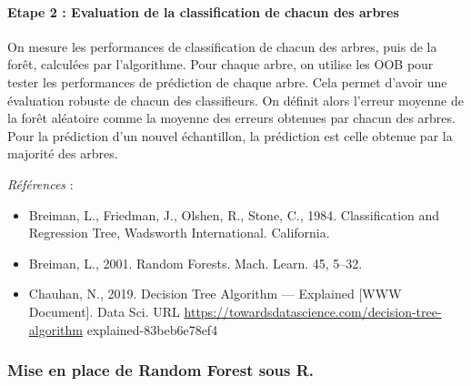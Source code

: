 \documentclass[
]{article}
\begin{document}
\hypertarget{etape-2-evaluation-de-la-classification-de-chacun-des-arbres}{%
\paragraph{Etape 2 : Evaluation de la classification de chacun des
arbres}\label{etape-2-evaluation-de-la-classification-de-chacun-des-arbres}}

On mesure les performances de classification de chacun des arbres, puis
de la forêt, calculées par l'algorithme. Pour chaque arbre, on utilise
les OOB pour tester les performances de prédiction de chaque arbre. Cela
permet d'avoir une évaluation robuste de chacun des classifieurs. On
définit alors l'erreur moyenne de la forêt aléatoire comme la moyenne
des erreurs obtenues par chacun des arbres. Pour la prédiction d'un
nouvel échantillon, la prédiction est celle obtenue par la majorité des
arbres.

\emph{Références} :

\begin{itemize}
\item
  Breiman, L., Friedman, J., Olshen, R., Stone, C., 1984. Classification
  and Regression Tree, Wadsworth International. California.
\item
  Breiman, L., 2001. Random Forests. Mach. Learn. 45, 5--32.
\item
  Chauhan, N., 2019. Decision Tree Algorithm --- Explained {[}WWW
  Document{]}. Data Sci. URL
  \url{https://towardsdatascience.com/decision-tree-algorithm}
  explained-83beb6e78ef4
\end{itemize}

\hypertarget{mise-en-place-de-random-forest-sous-r.}{%
\subsubsection{Mise en place de Random Forest sous
R.}\label{mise-en-place-de-random-forest-sous-r.}}
\end{document}
